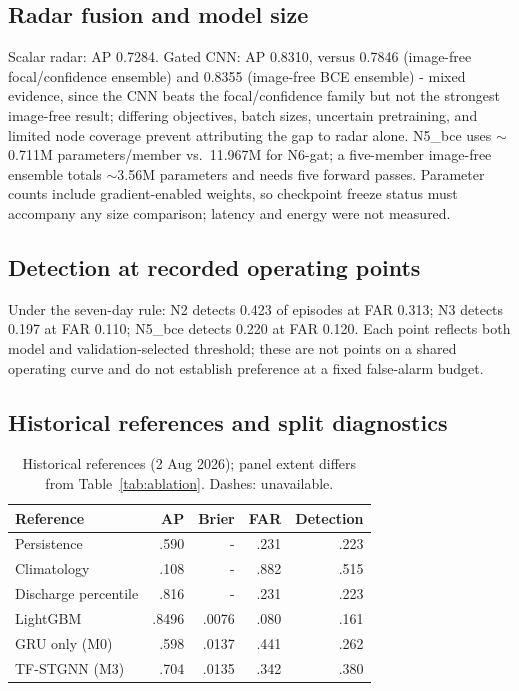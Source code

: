 \documentclass[conference]{IEEEtran}
\newcommand{\bce}{N5\_bce}
\begin{document}
\subsection{Radar fusion and model size}
Scalar radar: AP 0.7284. Gated CNN: AP 0.8310, versus 0.7846
(image-free focal/confidence ensemble) and 0.8355 (image-free BCE ensemble)
- mixed evidence, since the CNN beats the focal/confidence family but not
the strongest image-free result; differing objectives, batch sizes,
uncertain pretraining, and limited node coverage prevent attributing the
gap to radar alone. \bce{} uses $\sim$0.711M parameters/member vs.\ 11.967M
for N6-gat; a five-member image-free ensemble totals $\sim$3.56M parameters
and needs five forward passes. Parameter counts include gradient-enabled
weights, so checkpoint freeze status must accompany any size comparison;
latency and energy were not measured.

\subsection{Detection at recorded operating points}
Under the seven-day rule: N2 detects 0.423 of episodes at FAR 0.313; N3
detects 0.197 at FAR 0.110; \bce{} detects 0.220 at FAR 0.120. Each point
reflects both model and validation-selected threshold; these are not points
on a shared operating curve and do not establish preference at a fixed
false-alarm budget.

\subsection{Historical references and split diagnostics}
\begin{table}[t]
\caption{Historical references (2 Aug 2026); panel extent differs from
Table~\ref{tab:ablation}. Dashes: unavailable.}
\label{tab:legacy}
\centering\footnotesize
\begin{tabular}{@{}lrrrr@{}}
\toprule
Reference & AP & Brier & FAR & Detection \\
\midrule
Persistence & .590 & - & .231 & .223 \\
Climatology & .108 & - & .882 & .515 \\
Discharge percentile & .816 & - & .231 & .223 \\
LightGBM & .8496 & .0076 & .080 & .161 \\
GRU only (M0) & .598 & .0137 & .441 & .262 \\
TF-STGNN (M3) & .704 & .0135 & .342 & .380 \\
\bottomrule
\end{tabular}
\end{table}
\end{document}
